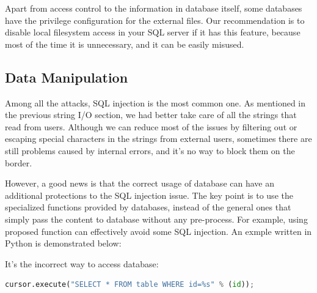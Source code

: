 \documentclass[conference]{IEEEtran}
\begin{document}


Apart from access control to the information in database itself,
some databases have the privilege configuration for
the external files.
Our recommendation is to
disable local filesystem access in your SQL server if it has this feature,
because most of the time it is unnecessary, and it can be easily misused.

\subsection{Data Manipulation}
Among all the attacks, SQL injection is the most common one.
As mentioned in the previous string I/O section,
we had better take care of all the strings that read from users.
Although we can reduce most of the issues by
filtering out or escaping special characters in the strings
from external users, sometimes there are still
problems caused by internal errors,
and it's no way to block them on the border.

However, a good news is that the correct usage of database can have an
additional protections to the SQL injection issue.
The key point is to use the specialized functions provided by databases,
instead of the general ones that simply pass the content to database
without any pre-process.
For example, using proposed function can effectively
avoid some SQL injection. An exmple written in Python is demonstrated below:

It's the incorrect way to access database:
\begin{lstlisting}[language=python]
cursor.execute("SELECT * FROM table WHERE id=%s" % (id));
\end{lstlisting}
\end{document}
